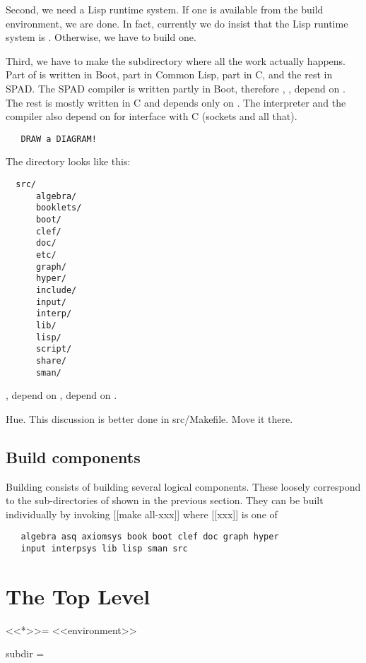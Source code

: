 \documentclass{article}
\begin{document}
Second, we need a Lisp runtime system.  If one is available from
the build environment, we are done.  In fact, currently we do insist that
the Lisp runtime system is .  Otherwise, we have to build one.

Third, we have to make the subdirectory  where all the
work actually happens.  Part of  is written in Boot, part
in Common Lisp, part in C, and the rest in SPAD.  The SPAD compiler
is written partly in Boot, therefore ,
,  depend on .  The rest
is mostly written in C and depends only on .  The
interpreter and the compiler also depend on  for interface
with C (sockets and all that).
\begin{verbatim}
   DRAW a DIAGRAM!
\end{verbatim}

The  directory looks like this:
\begin{verbatim}
  src/
      algebra/
      booklets/
      boot/
      clef/
      doc/
      etc/
      graph/
      hyper/
      include/
      input/
      interp/
      lib/
      lisp/
      script/
      share/
      sman/
\end{verbatim}

,  depend on ,
 depend on .

Hue. This discussion is better done in src/Makefile.  Move it there.

\subsection{Build components}

Building  consists of building several logical components.
These loosely correspond to the sub-directories of  shown in
the previous section.  They can be built individually by invoking
[[make all-xxx]] where [[xxx]] is one of
\begin{verbatim}
   algebra asq axiomsys book boot clef doc graph hyper
   input interpsys lib lisp sman src
\end{verbatim}

\section{The Top Level }
<<*>>=
<<environment>>

subdir =
\end{document}
